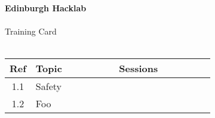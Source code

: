 \documentclass[a5paper]{article}
\begin{document}
\noindent
\textbf{Edinburgh Hacklab} \\
\\
Training Card \\
\\
\begin{tabularx}{\textwidth}{|c|X|c|c|c|c|c|c|c|c|c|c|c|c|c|c|c|}
    \hline
    \textbf{Ref} & \textbf{Topic} & \multicolumn{15}{c|}{\textbf{Sessions}} \\
    \hline
    1.1 & Safety
    & & & & & & & & & & & & & & & \\ \hline
    1.2 & Foo
    & & & & & & & & & & & & & & & \\ \hline
\end{tabularx}
\end{document}
